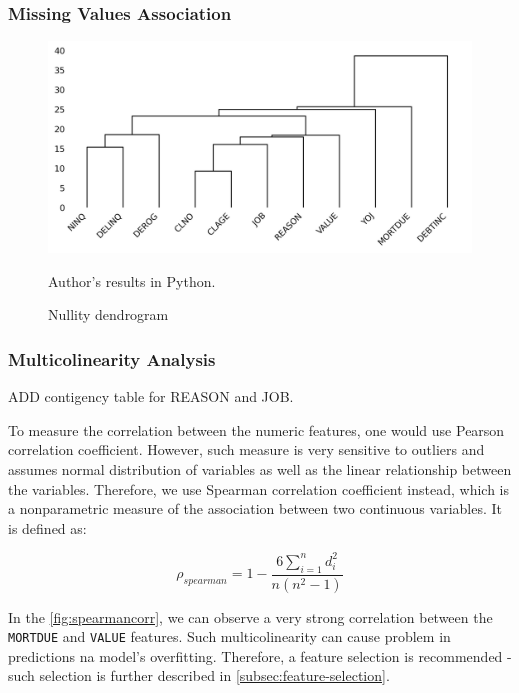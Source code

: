 \subsubsection{Missing Values Association}
    \begin{figure}[H]
        \begin{center}
        \caption{Nullity dendrogram}
        \label{fig:supply}
        \includegraphics[width=150mm]{Figures/NA_Dendrogram.jpg}
    \end{center}
    \begin{center}
        \begin{source}Author's results in Python.\end{source}
        \end{center}
    \end{figure}
    

\subsubsection{Multicolinearity Analysis}

ADD contigency table for REASON and JOB.

To measure the correlation between the numeric features, one would use Pearson correlation coefficient. However, such measure is very sensitive to outliers and assumes normal distribution of variables as well as the linear relationship between the variables. Therefore, we use Spearman correlation coefficient instead, which is a nonparametric measure of the association between two continuous variables. It is defined as:

\begin{equation}\label{eq}
	\rho_{spearman} = 1 - \frac{6 \sum_{i=1}^{n} d_{i}^{2}}{n \left(n^{2}-1\right)}
	\end{equation}


In the \autoref{fig:spearmancorr}, we can observe a very strong correlation between the \texttt{MORTDUE} and \texttt{VALUE} features. Such multicolinearity can cause problem in predictions na model's overfitting. Therefore, a feature selection is recommended - such selection is further described in \autoref{subsec:feature-selection}.

